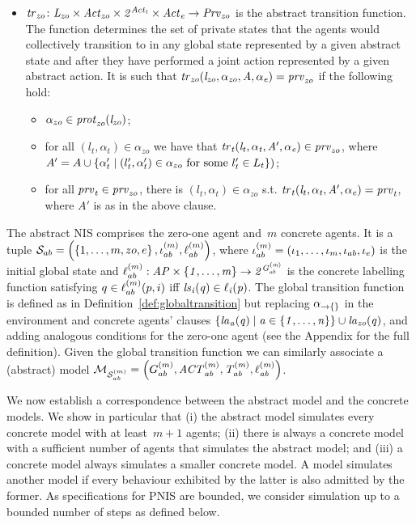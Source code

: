 \begin{definition}
\begin{itemize}
    \item $\it{tr}_{zo} \colon L_{zo} \times \it{Act}_{zo} \times 2^{\it{Act}_{t}} 
    \times \it{Act}_{e} \rightarrow \it{Prv}_{zo}$ is the abstract transition function.
    The function determines the set of private states that the agents would
    collectively transition to in any global state represented by a given
    abstract state and after they have performed a joint action represented by a
    given abstract action. It is such that $\it{tr}_{zo}(l_{zo}, \alpha_{zo}, A, \alpha_e)
    = \it{prv}_{zo}$ if the following hold:
    \begin{itemize}
        \item $\alpha_{zo} \in \it{prot}_{zo}(l_{zo})$; 
        \item for all $(l_t, \alpha_t) \in \alpha_{zo}$ we have that $\it{tr}_{t}(l_t,
        \alpha_t, A', \alpha_e) \in \it{prv}_{zo}$, where $A' = A \cup \left \{ \alpha'_t
        \mid (l'_t, \alpha'_t) \in \alpha_{zo} \text{ for some } l'_t \in L_{t} \right \})$;
        \item for all $\it{prv}_{t} \in \it{prv}_{zo}$, there is $(l_t, \alpha_t) \in
        \alpha_{zo}$ s.t. $\it{tr}_{t}(l_t, \alpha_t, A', \alpha_e) = \it{prv}_{t}$, where
        $A'$ is as in the above clause.  
    \end{itemize}
\end{itemize}
\end{definition}

The abstract  NIS comprises the zero-one agent and~$m$ concrete agents. It is a
tuple $\mathcal S_{ab} = \left ( \left \{ 1,\ldots,m,zo,e \right \}, \iota^{({m})}_{ab},
\ell^{(m)}_{ab} \right )$, where $\iota^{({m})}_{ab} = \left ( \iota_{1}, \ldots, \iota_{m}, \iota_{ab}, \iota_{e} \right )$ is the initial global state and $\ell^{(m)}_{ab} :
\it{AP} \times \left \{ 1, \ldots, m  \right \} \rightarrow 2^{G^{(m)}_{ab}}$ is the
concrete labelling function satisfying $q \in \ell^{(m)}_{ab}(p,i)$ iff
$\it{ls}_{i}(q) \in \ell_{i}(p)$.  The global transition function is defined as in
Definition~\ref{def:globaltransition} but replacing $\alpha_{\rightarrow\{\}}$ in
the environment and concrete agents' clauses $\left \{ \it{la}_{a}({q}) \mid a \in
\left \{ 1,\ldots,n \right \} \right \} \cup \it{la}_{zo}({q})$,  and adding analogous conditions for the
zero-one agent (see the Appendix for the full definition). Given the global
transition function we can similarly associate a (abstract) model  $\mathcal{M}_{\mathcal{S}_{ab}^{(m)}} =
\left ( G^{(m)}_{ab}, \it{ACT}^{(m)}_{ab}, T^{(m)}_{ab}, \ell^{(m)}_{ab} \right )$.

We now establish a correspondence between the abstract model and the concrete
models. We show in particular that (i) the abstract model simulates every
concrete model with at least~$m+1$ agents; (ii) there is always a concrete model
with a sufficient number of agents that simulates the abstract model; and (iii)
a concrete model always simulates a smaller concrete model. A model simulates another
model if every behaviour exhibited by the latter is also admitted by the former.
As specifications for PNIS are bounded, we consider simulation up to a bounded
number of steps as defined below.

